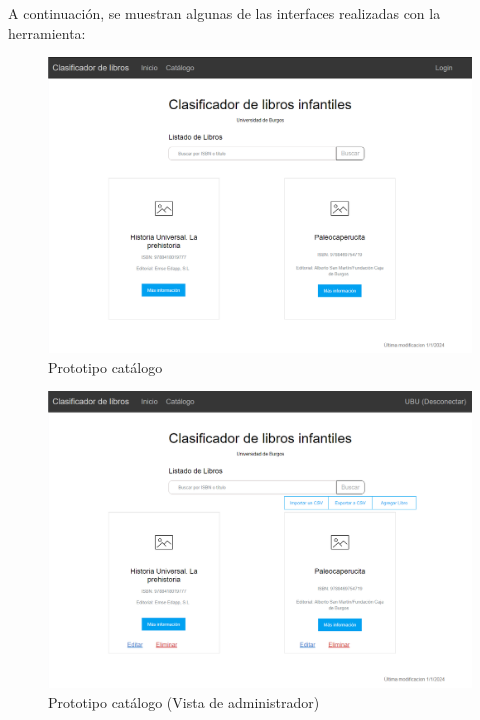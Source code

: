 A continuación, se muestran algunas de las interfaces realizadas con la herramienta:
\begin{figure}[htbp]
    \centering
    \includegraphics[width=0.9\linewidth]{Imagenes/PrototipoCatalogo.png}
    \caption{Prototipo catálogo}
    \label{Prototipo catálogo}
\end{figure}
\begin{figure}
    \centering
    \includegraphics[width=0.9\linewidth]{Imagenes/CatalogoAdministrador.png}
    \caption{Prototipo catálogo (Vista de administrador)}
    \label{Prototipo catálogo (Vista de administrador)}
\end{figure}
\FloatBarrier

